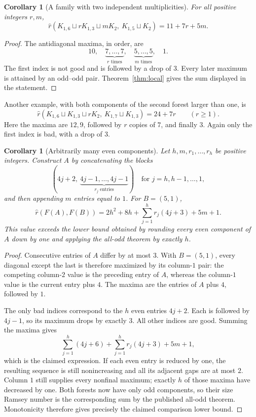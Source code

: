 \documentclass[11pt]{article}
\newtheorem{corollary}[theorem]{Corollary}
\theoremstyle{remark}\newtheorem{remark}[theorem]{Remark}
\newcommand{\sr}{\widehat r}
\newcommand{\sq}{\sqcup}
\begin{document}
\begin{corollary}[A family with two independent multiplicities]\label{cor:family}
For all positive integers $r,m$,
\[
 \sr(K_{1,6}\sq rK_{1,3}\sq mK_2,\ K_{1,5}\sq K_2)
 =11+7r+5m.
\]
\end{corollary}
\begin{proof}
The antidiagonal maxima, in order, are
\[
 10,\quad\underbrace{7,\ldots,7}_{r\text{ times}},\quad
 \underbrace{5,\ldots,5}_{m\text{ times}},\quad1.
\]
The first index is not good and is followed by a drop of $3$. Every later maximum is attained by an odd--odd pair. Theorem~\ref{thm:local} gives the sum displayed in the statement.
\end{proof}

Another example, with both components of the second forest larger than one, is
\[
 \sr(K_{1,6}\sq K_{1,3}\sq rK_2,\ K_{1,7}\sq K_{1,3})=24+7r
 \qquad(r\ge1).
\]
Here the maxima are $12,9$, followed by $r$ copies of $7$, and finally $3$. Again only the first index is bad, with a drop of $3$.

\begin{corollary}[Arbitrarily many even components]\label{cor:many}
Let $h,m,r_1,\ldots,r_h$ be positive integers. Construct $A$ by concatenating the blocks
\[
 \left(4j+2,\ \underbrace{4j-1,\ldots,4j-1}_{r_j\text{ entries}}\right)
 \quad\text{for }j=h,h-1,\ldots,1,
\]
and then appending $m$ entries equal to $1$. For $B=(5,1)$,
\[
 \sr(F(A),F(B))=2h^2+8h+\sum_{j=1}^h r_j(4j+3)+5m+1.
\]
This value exceeds the lower bound obtained by rounding every even component of $A$ down by one and applying the all-odd theorem by exactly $h$.
\end{corollary}
\begin{proof}
Consecutive entries of $A$ differ by at most $3$. With $B=(5,1)$, every diagonal except the last is therefore maximized by its column-$1$ pair: the competing column-$2$ value is the preceding entry of $A$, whereas the column-$1$ value is the current entry plus $4$. The maxima are the entries of $A$ plus $4$, followed by $1$.

The only bad indices correspond to the $h$ even entries $4j+2$. Each is followed by $4j-1$, so its maximum drops by exactly $3$. All other indices are good. Summing the maxima gives
\[
 \sum_{j=1}^h(4j+6)+\sum_{j=1}^h r_j(4j+3)+5m+1,
\]
which is the claimed expression. If each even entry is reduced by one, the resulting sequence is still nonincreasing and all its adjacent gaps are at most $2$. Column $1$ still supplies every nonfinal maximum; exactly $h$ of those maxima have decreased by one. Both forests now have only odd components, so their size Ramsey number is the corresponding sum by the published all-odd theorem. Monotonicity therefore gives precisely the claimed comparison lower bound.
\end{proof}
\end{document}
